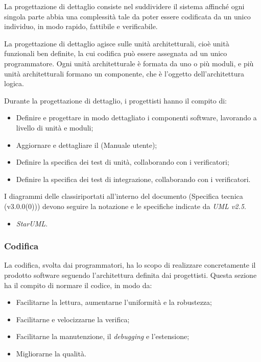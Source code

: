 \documentclass[10pt, a4paper]{article}
\begin{document}
\label{sec:progettazione_di_dettaglio}
La progettazione di dettaglio consiste nel suddividere il sistema affinché ogni singola parte abbia una complessità tale da poter essere codificata da un unico individuo, in modo rapido, fattibile e verificabile.


La progettazione di dettaglio agisce sulle unità architetturali, cioè unità funzionali ben definite, la cui codifica può essere assegnata ad un unico programmatore.
Ogni unità architetturale è formata da uno o più moduli, e più unità architetturali formano un componente, che è l'oggetto dell'architettura logica.

Durante la progettazione di dettaglio, i progettisti hanno il compito di:
\begin{itemize}
    \item Definire e progettare in modo dettagliato i componenti software, lavorando a livello di unità e moduli;
    \item Aggiornare e dettagliare il (Manuale utente);
    \item Definire la specifica dei test di unità, collaborando con i verificatori;
    \item Definire la specifica dei test di integrazione, collaborando con i verificatori.
\end{itemize}

I diagrammi delle classiriportati all'interno del documento (Specifica tecnica (v3.0.0(0))) devono seguire la notazione e le specifiche indicate da \textit{UML v2.5}.

\begin{itemize}
    \item \textit{StarUML}.
\end{itemize}


\subsubsection{Codifica}
La codifica, svolta dai programmatori, ha lo scopo di realizzare concretamente il prodotto software seguendo l'architettura definita dai progettisti.
Questa sezione ha il compito di normare il codice, in modo da:
\begin{itemize}
    \item Facilitarne la lettura, aumentarne l'uniformità e la robustezza;
    \item Facilitarne e velocizzarne la verifica;
    \item Facilitarne la manutenzione, il \textit{debugging\pg} e l'estensione;
    \item Migliorarne la qualità.
\end{itemize}
\end{document}
